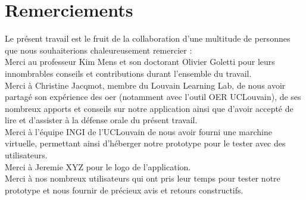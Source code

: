 \chapter*{Remerciements}

Le présent travail est le fruit de la collaboration d'une multitude de personnes que nous souhaiterions chaleureusement remercier : \\

Merci au professeur Kim Mens et son doctorant Olivier Goletti pour leurs innombrables conseils et contributions durant l'ensemble du travail. \\

Merci à Christine Jacqmot, membre du Louvain Learning Lab, de nous avoir partagé son expérience des \Gls{oer} (notamment avec l'outil OER UCLouvain), de ses nombreux apports et conseils sur notre application ainsi que d'avoir accepté de lire et d'assister à la défense orale du présent travail.\\

Merci à l'équipe INGI de l'UCLouvain de nous avoir fourni une marchine virtuelle, permettant ainsi d'héberger notre prototype pour le tester avec des utilisateurs. \\

Merci à Jeremie XYZ pour le logo de l'application.\\

Merci à nos nombreux utilisateurs qui ont pris leur temps pour tester notre prototype et nous fournir de précieux avis et retours constructifs.

